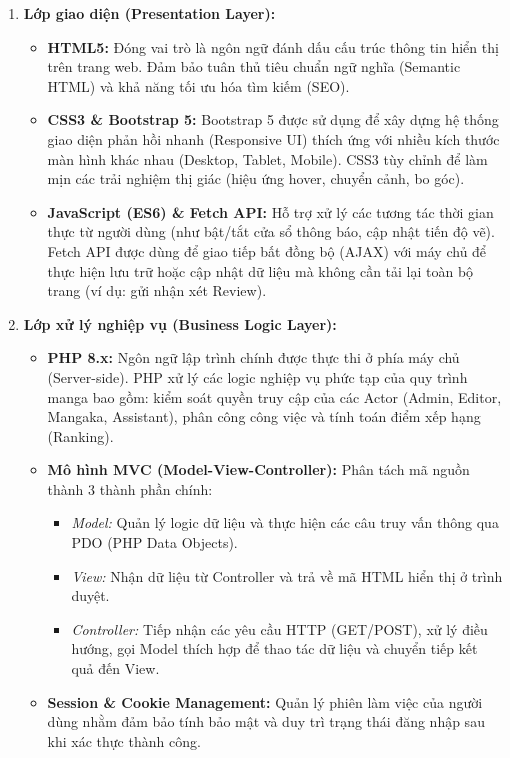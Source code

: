 \begin{enumerate}
    \item \textbf{Lớp giao diện (Presentation Layer):}
    \begin{itemize}
        \item \textbf{HTML5:} Đóng vai trò là ngôn ngữ đánh dấu cấu trúc thông tin hiển thị trên trang web. Đảm bảo tuân thủ tiêu chuẩn ngữ nghĩa (Semantic HTML) và khả năng tối ưu hóa tìm kiếm (SEO).
        \item \textbf{CSS3 \& Bootstrap 5:} Bootstrap 5 được sử dụng để xây dựng hệ thống giao diện phản hồi nhanh (Responsive UI) thích ứng với nhiều kích thước màn hình khác nhau (Desktop, Tablet, Mobile). CSS3 tùy chỉnh để làm mịn các trải nghiệm thị giác (hiệu ứng hover, chuyển cảnh, bo góc).
        \item \textbf{JavaScript (ES6) \& Fetch API:} Hỗ trợ xử lý các tương tác thời gian thực từ người dùng (như bật/tắt cửa sổ thông báo, cập nhật tiến độ vẽ). Fetch API được dùng để giao tiếp bất đồng bộ (AJAX) với máy chủ để thực hiện lưu trữ hoặc cập nhật dữ liệu mà không cần tải lại toàn bộ trang (ví dụ: gửi nhận xét Review).
    \end{itemize}

    \item \textbf{Lớp xử lý nghiệp vụ (Business Logic Layer):}
    \begin{itemize}
        \item \textbf{PHP 8.x:} Ngôn ngữ lập trình chính được thực thi ở phía máy chủ (Server-side). PHP xử lý các logic nghiệp vụ phức tạp của quy trình manga bao gồm: kiểm soát quyền truy cập của các Actor (Admin, Editor, Mangaka, Assistant), phân công công việc và tính toán điểm xếp hạng (Ranking).
        \item \textbf{Mô hình MVC (Model-View-Controller):} Phân tách mã nguồn thành 3 thành phần chính:
        \begin{itemize}
            \item \textit{Model:} Quản lý logic dữ liệu và thực hiện các câu truy vấn thông qua PDO (PHP Data Objects).
            \item \textit{View:} Nhận dữ liệu từ Controller và trả về mã HTML hiển thị ở trình duyệt.
            \item \textit{Controller:} Tiếp nhận các yêu cầu HTTP (GET/POST), xử lý điều hướng, gọi Model thích hợp để thao tác dữ liệu và chuyển tiếp kết quả đến View.
        \end{itemize}
        \item \textbf{Session \& Cookie Management:} Quản lý phiên làm việc của người dùng nhằm đảm bảo tính bảo mật và duy trì trạng thái đăng nhập sau khi xác thực thành công.
    \end{itemize}


\end{enumerate}
